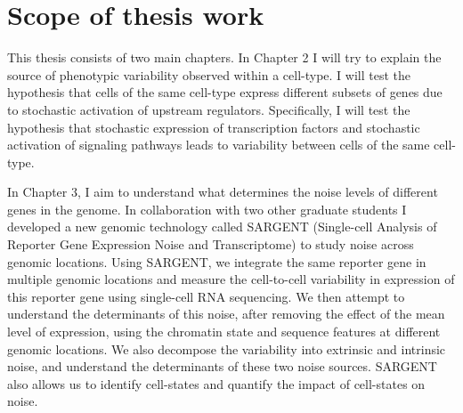 \section{Scope of thesis work}

This thesis consists of two main chapters. In  Chapter 2 I will try to explain the source of phenotypic variability observed within a cell-type. I will test the hypothesis that cells of the same cell-type express different subsets of genes due to stochastic activation of upstream regulators. Specifically, I will test the hypothesis that stochastic expression of transcription factors and stochastic activation of signaling pathways leads to variability between cells of the same cell-type.

In Chapter 3, I aim to understand what determines the noise levels of different genes in the genome. In collaboration with two other graduate students I developed a new genomic technology called SARGENT (Single-cell Analysis of Reporter Gene Expression Noise and Transcriptome) to study noise across genomic locations. Using SARGENT, we integrate the same reporter gene in multiple genomic locations and measure the cell-to-cell variability in expression of this reporter gene using single-cell RNA sequencing. We then attempt to understand the determinants of this noise, after removing the effect of the mean level of expression, using the chromatin state and sequence features at different genomic locations. We also decompose the variability into extrinsic and intrinsic noise, and understand the determinants of these two noise sources. SARGENT also allows us to identify cell-states and quantify the impact of cell-states on noise.
